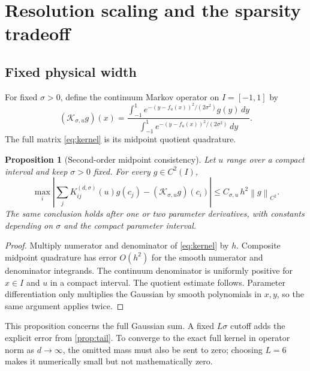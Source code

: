 \documentclass[11pt]{article}
\newtheorem{proposition}[theorem]{Proposition}
\theoremstyle{definition}
\theoremstyle{remark}
\newcommand{\norm}[1]{\left\lVert #1\right\rVert}
\begin{document}
\section{Resolution scaling and the sparsity tradeoff}
\label{sec:resolution}

\subsection{Fixed physical width}

For fixed $\sigma>0$, define the continuum Markov operator on
$I=[-1,1]$ by
\begin{equation}\label{eq:continuum-kernel}
  (\mathcal K_{\sigma,u}g)(x)=
  \frac{\int_{-1}^1
    e^{-(y-f_u(x))^2/(2\sigma^2)}g(y)\,dy}
       {\int_{-1}^1
    e^{-(y-f_u(x))^2/(2\sigma^2)}\,dy}.
\end{equation}
The full matrix \eqref{eq:kernel} is its midpoint quotient quadrature.

\begin{proposition}[Second-order midpoint consistency]
\label{prop:midpoint}
Let $u$ range over a compact interval and keep $\sigma>0$ fixed.
For every $g\in C^2(I)$,
\begin{equation}\label{eq:midpoint}
  \max_i\left|
    \sum_jK_{ij}^{(d,\sigma)}(u)g(c_j)
    -(\mathcal K_{\sigma,u}g)(c_i)
  \right|
  \le C_{\sigma,u}\,h^2\norm{g}_{C^2}.
\end{equation}
The same conclusion holds after one or two parameter derivatives, with
constants depending on $\sigma$ and the compact parameter interval.
\end{proposition}

\begin{proof}
Multiply numerator and denominator of \eqref{eq:kernel} by $h$.
Composite midpoint quadrature has error $O(h^2)$ for the smooth numerator
and denominator integrands.  The continuum denominator is uniformly
positive for $x\in I$ and $u$ in a compact interval.  The quotient estimate
follows.  Parameter differentiation only multiplies the Gaussian by smooth
polynomials in $x,y$, so the same argument applies twice.
\end{proof}

This proposition concerns the full Gaussian sum.  A fixed $L\sigma$ cutoff
adds the explicit error from \cref{prop:tail}.  To converge to the exact
full kernel in operator norm as $d\to\infty$, the omitted mass must also be
sent to zero; choosing $L=6$ makes it numerically small but not
mathematically zero.
\end{document}
